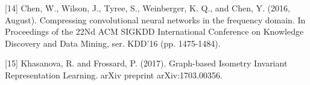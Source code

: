 \documentclass{article}
\begin{document}
[14] Chen, W., Wilson, J., Tyree, S., Weinberger, K. Q., and Chen, Y. (2016, August). Compressing convolutional neural networks in the frequency domain. In Proceedings of the 22Nd ACM SIGKDD International Conference on Knowledge Discovery and Data Mining, ser. KDD’16 (pp. 1475-1484).

[15] Khasanova, R. and Frossard, P. (2017). Graph-based Isometry Invariant Representation Learning. arXiv preprint arXiv:1703.00356.


\nocite{langley00}



\end{document}
